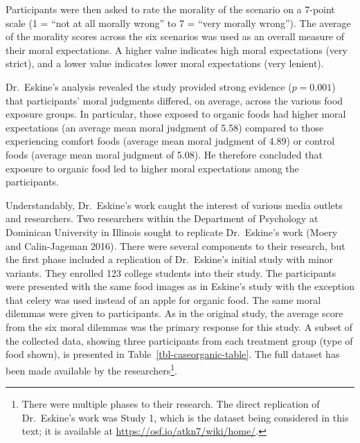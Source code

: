 \documentclass[
  letterpaper,
  DIV=11,
  numbers=noendperiod]{scrreprt}
\theoremstyle{plain}
\theoremstyle{definition}
\theoremstyle{definition}
\theoremstyle{remark}
\begin{document}
Participants were then asked to rate the morality of the scenario on a
7-point scale (1 = ``not at all morally wrong'' to 7 = ``very morally
wrong''). The average of the morality scores across the six scenarios
was used as an overall measure of their moral expectations. A higher
value indicates high moral expectations (very strict), and a lower value
indicates lower moral expectations (very lenient).

Dr.~Eskine's analysis revealed the study provided strong evidence
(\(p = 0.001\)) that participants' moral judgments differed, on average,
across the various food exposure groups. In particular, those exposed to
organic foods had higher moral expectations (an average mean moral
judgment of 5.58) compared to those experiencing comfort foods (average
mean moral judgment of 4.89) or control foods (average mean moral
judgment of 5.08). He therefore concluded that exposure to organic food
led to higher moral expectations among the participants.

Understandably, Dr.~Eskine's work caught the interest of various media
outlets and researchers. Two researchers within the Department of
Psychology at Dominican University in Illinois sought to replicate
Dr.~Eskine's work (Moery and Calin-Jageman 2016). There were several
components to their research, but the first phase included a replication
of Dr.~Eskine's initial study with minor variants. They enrolled 123
college students into their study. The participants were presented with
the same food images as in Eskine's study with the exception that celery
was used instead of an apple for organic food. The same moral dilemmas
were given to participants. As in the original study, the average score
from the six moral dilemmas was the primary response for this study. A
subset of the collected data, showing three participants from each
treatment group (type of food shown), is presented in
Table~\ref{tbl-caseorganic-table}. The full dataset has been made
available by the researchers\footnote{There were multiple phases to
  their research. The direct replication of Dr.~Eskine's work was Study
  1, which is the dataset being considered in this text; it is available
  at \url{https://osf.io/atkn7/wiki/home/}.}.
\end{document}
